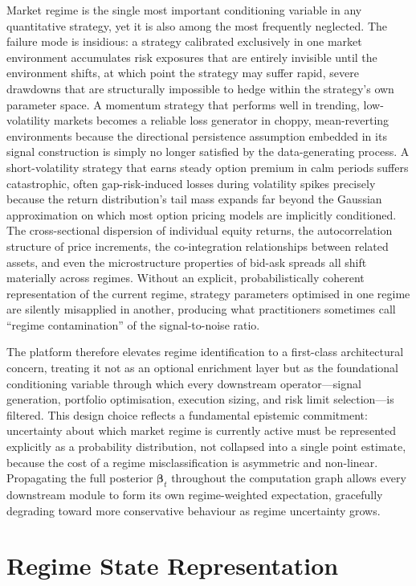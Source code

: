 \documentclass[12pt,openany]{book}
\numberwithin{equation}{chapter}
\theoremstyle{plain}
\theoremstyle{definition}
\theoremstyle{remark}
\begin{document}
Market regime is the single most important conditioning variable in any quantitative strategy, yet it is also among the most frequently neglected. The failure mode is insidious: a strategy calibrated exclusively in one market environment accumulates risk exposures that are entirely invisible until the environment shifts, at which point the strategy may suffer rapid, severe drawdowns that are structurally impossible to hedge within the strategy's own parameter space. A momentum strategy that performs well in trending, low-volatility markets becomes a reliable loss generator in choppy, mean-reverting environments because the directional persistence assumption embedded in its signal construction is simply no longer satisfied by the data-generating process. A short-volatility strategy that earns steady option premium in calm periods suffers catastrophic, often gap-risk-induced losses during volatility spikes precisely because the return distribution's tail mass expands far beyond the Gaussian approximation on which most option pricing models are implicitly conditioned. The cross-sectional dispersion of individual equity returns, the autocorrelation structure of price increments, the co-integration relationships between related assets, and even the microstructure properties of bid-ask spreads all shift materially across regimes. Without an explicit, probabilistically coherent representation of the current regime, strategy parameters optimised in one regime are silently misapplied in another, producing what practitioners sometimes call ``regime contamination'' of the signal-to-noise ratio.

The platform therefore elevates regime identification to a first-class architectural concern, treating it not as an optional enrichment layer but as the foundational conditioning variable through which every downstream operator---signal generation, portfolio optimisation, execution sizing, and risk limit selection---is filtered. This design choice reflects a fundamental epistemic commitment: uncertainty about which market regime is currently active must be represented explicitly as a probability distribution, not collapsed into a single point estimate, because the cost of a regime misclassification is asymmetric and non-linear. Propagating the full posterior $\boldsymbol{\beta}_t$ throughout the computation graph allows every downstream module to form its own regime-weighted expectation, gracefully degrading toward more conservative behaviour as regime uncertainty grows.

\section{Regime State Representation}
\end{document}
